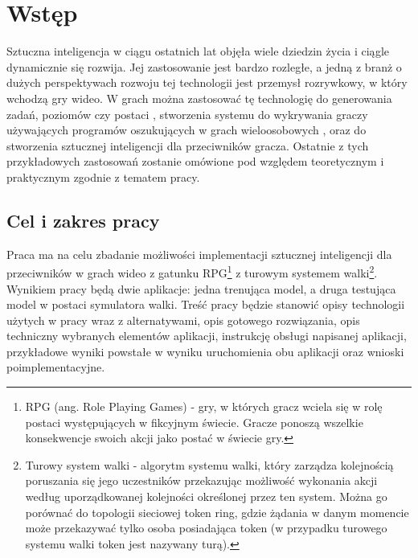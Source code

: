 \documentclass{SGGW-thesis}
\begin{document}
\startchapterfromoddpage %

\chapter{Wstęp}
Sztuczna inteligencja w ciągu ostatnich lat objęła wiele dziedzin życia i ciągle dynamicznie się rozwija. 
Jej zastosowanie jest bardzo rozległe, a jedną z branż o dużych perspektywach rozwoju tej technologii jest przemysł rozrywkowy, 
w który wchodzą gry wideo. W grach można zastosować tę technologię do generowania zadań, poziomów czy postaci \cite{proceduralgen}, 
stworzenia systemu do wykrywania graczy używających programów oszukujących w grach wieloosobowych \cite{cheating}, oraz do stworzenia 
sztucznej inteligencji dla przeciwników gracza. Ostatnie z tych przykładowych zastosowań zostanie omówione pod względem teoretycznym i praktycznym 
zgodnie z tematem pracy.

\section{Cel i zakres pracy}
Praca ma na celu zbadanie możliwości implementacji sztucznej inteligencji dla przeciwników w grach wideo z gatunku RPG\footnote{RPG (ang. Role Playing Games)
- gry, w których gracz wciela się w rolę postaci występujących w fikcyjnym świecie. Gracze ponoszą wszelkie konsekwencje swoich akcji jako postać w świecie gry.}
z turowym systemem walki\footnote{Turowy system walki - algorytm systemu walki, który zarządza kolejnością poruszania się jego uczestników przekazując możliwość wykonania akcji według uporządkowanej kolejności określonej przez ten system. Można go porównać do topologii sieciowej token ring, gdzie żądania w danym momencie może przekazywać tylko osoba posiadająca token (w przypadku turowego systemu walki token jest nazywany turą).}. 
Wynikiem pracy będą dwie aplikacje: jedna trenująca model, a druga testująca model w postaci symulatora walki. 
Treść pracy będzie stanowić opisy technologii użytych w pracy wraz z alternatywami, opis gotowego rozwiązania, opis techniczny wybranych elementów aplikacji, instrukcję obsługi napisanej aplikacji, przykładowe wyniki powstałe w wyniku uruchomienia obu aplikacji oraz wnioski poimplementacyjne.
\end{document}
